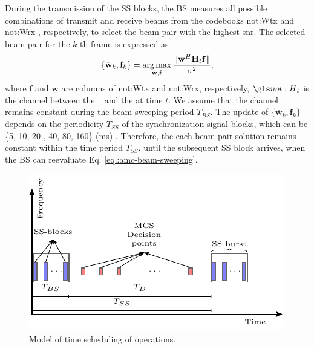 During the transmission of the SS blocks, the BS measures all possible combinations of transmit and receive beams from the codebooks \gls{not:Wtx}  and \gls{not:Wrx} , respectively,  to select the beam pair with the highest \gls{snr}.
%
The selected beam pair for the $k$-th frame is expressed as
\begin{equation}
\label{eq.:amc-beam-sweeping}
  \{ \bar{\mathbf{w}}_k, \bar{\mathbf{f}}_k \}= \operatorname*{arg\,max}_{\mathbf{w}, \mathbf{f}} \frac{\|\mathbf{w}^H \mathbf{H}_t \mathbf{f}\|}{\sigma ^2},
\end{equation}
%
\noindent where $\mathbf{f}$ and $\mathbf{w}$ are columns of \gls{not:Wtx} and \gls{not:Wrx}, respectively,  $\channel _t $  is the channel between the \base~ and the \ue at time $t$. We assume that the channel remains constant during the beam sweeping period $T_{BS}$.
%
The update of $\{ \bar{\mathbf{w}}_k, \bar{\mathbf{f}}_k \}$ depends on the periodicity $T_{SS}$ of the synchronization signal blocks, which can be  \{5, 10, 20 , 40, 80, 160\} (ms) \cite{giordani21}.
%
Therefore, the each beam pair solution remains constant within the time period $T_{SS}$, until the subsequent SS block arrives, when the BS can reevaluate Eq. \eqref{eq.:amc-beam-sweeping}.
%


\begin{figure}[tb]
\centerline{\includegraphics[width=0.7\columnwidth]{figures/chp_amc/amc_q_learning.pdf}}
\caption{Model of time scheduling of operations.}
\label{fig:amc-system-timing}
\end{figure}


